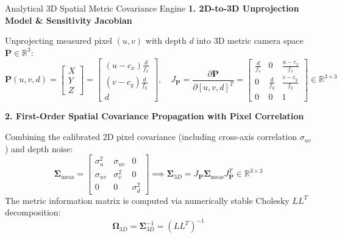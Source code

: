 \documentclass[aspectratio=169, 10pt]{beamer}
\begin{document}
\begin{frame}{Analytical 3D Spatial Metric Covariance Engine}
  {\normalsize \textbf{\textcolor{NavyBlue}{1. 2D-to-3D Unprojection Model \& Sensitivity Jacobian}}}
  \vspace{0.1cm}

  Unprojecting measured pixel $(u, v)$ with depth $d$ into 3D metric camera space $\mathbf{P} \in \mathbb{R}^3$:
  \begin{equation}
    \mathbf{P}(u, v, d) = \begin{bmatrix} X \\ Y \\ Z \end{bmatrix} = \begin{bmatrix} (u - c_x) \frac{d}{f_x} \\[4pt] (v - c_y) \frac{d}{f_y} \\[4pt] d \end{bmatrix}, \quad
    J_{\mathbf{P}} = \frac{\partial \mathbf{P}}{\partial [u, v, d]^T} = \begin{bmatrix}
      \frac{d}{f_x} & 0 & \frac{u - c_x}{f_x} \\[4pt]
      0 & \frac{d}{f_y} & \frac{v - c_y}{f_y} \\[4pt]
      0 & 0 & 1
    \end{bmatrix} \in \mathbb{R}^{3 \times 3}
  \end{equation}

  \vspace{0.2cm}
  {\normalsize \textbf{\textcolor{NavyBlue}{2. First-Order Spatial Covariance Propagation with Pixel Correlation}}}
  \vspace{0.1cm}

  Combining the calibrated 2D pixel covariance (including cross-axis correlation $\sigma_{uv}$) and depth noise:
  \begin{equation}
    \mathbf{\Sigma}_{\text{meas}} = \begin{bmatrix} \sigma_u^2 & \sigma_{uv} & 0 \\ \sigma_{uv} & \sigma_v^2 & 0 \\ 0 & 0 & \sigma_d^2 \end{bmatrix} \implies \mathbf{\Sigma}_{3D} = J_{\mathbf{P}} \mathbf{\Sigma}_{\text{meas}} J_{\mathbf{P}}^T \in \mathbb{R}^{3 \times 3}
  \end{equation}
  The metric information matrix is computed via numerically stable Cholesky $LL^T$ decomposition:
  \begin{equation}
    \mathbf{\Omega}_{3D} = \mathbf{\Sigma}_{3D}^{-1} = (L L^T)^{-1}
  \end{equation}
\end{frame}
\end{document}
